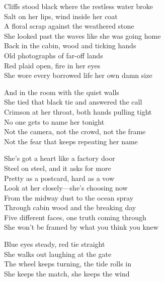 \begin{lyrics}
Cliffs stood black where the restless water broke\\
Salt on her lips, wind inside her coat\\
A floral scrap against the weathered stone\\
She looked past the waves like she was going home\\
Back in the cabin, wood and ticking hands\\
Old photographs of far-off lands\\
Red plaid open, fire in her eyes\\
She wore every borrowed life her own damn size

And in the room with the quiet walls\\
She tied that black tie and answered the call\\
Crimson at her throat, both hands pulling tight\\
No one gets to name her tonight\\
Not the camera, not the crowd, not the frame\\
Not the fear that keeps repeating her name

She’s got a heart like a factory door\\
Steel on steel, and it asks for more\\
Pretty as a postcard, hard as a vow\\
Look at her closely—she’s choosing now\\
From the midway dust to the ocean spray\\
Through cabin wood and the breaking day\\
Five different faces, one truth coming through\\
She won’t be framed by what you think you knew

Blue eyes steady, red tie straight\\
She walks out laughing at the gate\\
The wheel keeps turning, the tide rolls in\\
She keeps the match, she keeps the wind
\end{lyrics}